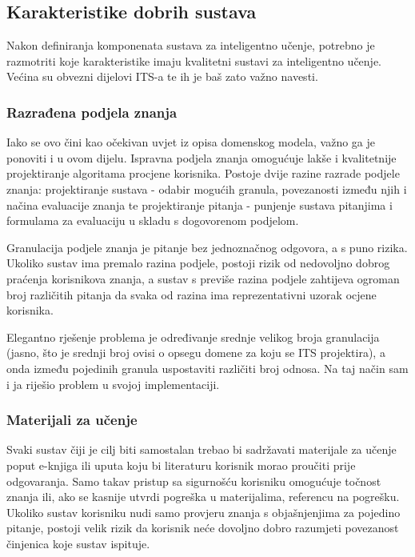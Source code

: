 \documentclass[times, utf8, zavrsni]{fer}
\begin{document}
\subsection{Karakteristike dobrih sustava}
Nakon definiranja komponenata sustava za inteligentno učenje, potrebno je razmotriti koje karakteristike imaju kvalitetni sustavi za inteligentno učenje. Većina su obvezni dijelovi ITS-a te ih je baš zato važno navesti.

\subsubsection{Razrađena podjela znanja}
Iako se ovo čini kao očekivan uvjet iz  opisa domenskog modela, važno ga je ponoviti i u ovom dijelu. Ispravna podjela znanja omogućuje lakše i kvalitetnije projektiranje algoritama procjene korisnika. Postoje dvije razine razrade podjele znanja: projektiranje sustava - odabir mogućih granula, povezanosti između njih i načina evaluacije znanja te projektiranje pitanja - punjenje sustava pitanjima i formulama za evaluaciju u skladu s dogovorenom podjelom.
\par
Granulacija podjele znanja je pitanje bez jednoznačnog odgovora, a s puno rizika. Ukoliko sustav ima premalo razina podjele, postoji rizik od nedovoljno dobrog praćenja korisnikova znanja, a sustav s previše razina podjele zahtijeva ogroman broj različitih pitanja da svaka od razina ima reprezentativni uzorak ocjene korisnika.
\par
Elegantno rješenje problema je određivanje srednje velikog broja granulacija (jasno, što je srednji broj ovisi o opsegu domene za koju se ITS projektira), a onda između pojedinih granula uspostaviti različiti broj odnosa. Na taj način sam i ja riješio problem u svojoj implementaciji.

\subsubsection{Materijali za učenje}
Svaki sustav čiji je cilj biti samostalan trebao bi sadržavati materijale za učenje poput e-knjiga ili uputa koju bi literaturu korisnik morao proučiti prije odgovaranja. Samo takav pristup sa sigurnošću korisniku omogućuje točnost znanja ili, ako se kasnije utvrdi pogreška u materijalima, referencu na pogrešku. Ukoliko sustav korisniku nudi samo provjeru znanja s objašnjenjima za pojedino pitanje, postoji velik rizik da korisnik neće dovoljno dobro razumjeti povezanost činjenica koje sustav ispituje.
\end{document}
